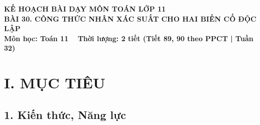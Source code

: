\documentclass[12pt, a4paper]{article}
\begin{document}
\begin{center}
    {\fontsize{14pt}{17pt}\selectfont \textbf{KẾ HOẠCH BÀI DẠY MÔN TOÁN LỚP 11}}\\[6pt]
    {\fontsize{16pt}{19pt}\selectfont \textbf{BÀI 30. CÔNG THỨC NHÂN XÁC SUẤT CHO HAI BIẾN CỐ ĐỘC LẬP}}\\[4pt]
    {\fontsize{12pt}{15pt}\selectfont \textbf{Môn học: Toán 11} \ \textbar \ \textbf{Thời lượng: 2 tiết (Tiết 89, 90 theo PPCT | Tuần 32)}}
\end{center}

\vspace{5pt}

\section*{I. MỤC TIÊU}

\subsection*{1. Kiến thức, Năng lực}
\end{document}
